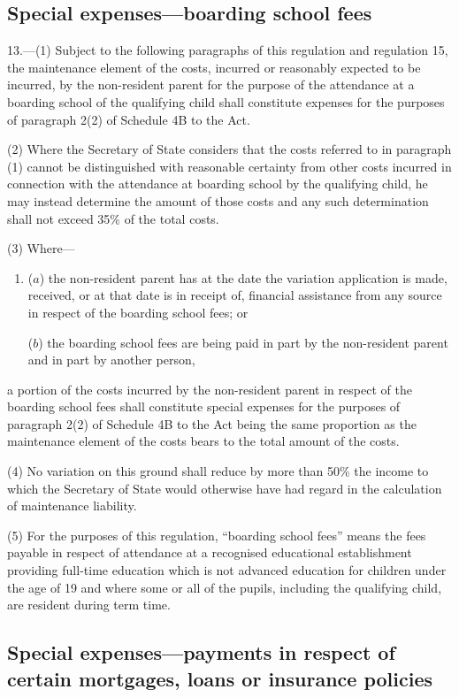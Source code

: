 \documentclass[12pt,a4paper]{article}
\begin{document}
\subsection[13. Special expenses—boarding school fees]{Special expenses—boarding school fees}

13.---(1)  Subject to the following paragraphs of this regulation and regulation 15, the maintenance element of the costs, incurred or reasonably expected to be incurred, by the non-resident parent for the purpose of the attendance at a boarding school of the qualifying child shall constitute expenses for the purposes of paragraph 2(2) of Schedule 4B to the Act.

(2) Where the Secretary of State considers that the costs referred to in paragraph (1) cannot be distinguished with reasonable certainty from other costs incurred in connection with the attendance at boarding school by the qualifying child, he may instead determine the amount of those costs and any such determination shall not exceed 35\% of the total costs.

(3) Where—
\begin{enumerate}\item[]
($a$) the non-resident parent has at the date the variation application is made, received, or at that date is in receipt of, financial assistance from any source in respect of the boarding school fees; or

($b$) the boarding school fees are being paid in part by the non-resident parent and in part by another person,
\end{enumerate}
a portion of the costs incurred by the non-resident parent in respect of the boarding school fees shall constitute special expenses for the purposes of paragraph 2(2) of Schedule 4B to the Act being the same proportion as the maintenance element of the costs bears to the total amount of the costs.

(4) No variation on this ground shall reduce by more than 50\% the income to which the Secretary of State would otherwise have had regard in the calculation of maintenance liability.

(5) For the purposes of this regulation, “boarding school fees” means the fees payable in respect of attendance at a recognised educational establishment providing full-time education which is not advanced education for children under the age of 19 and where some or all of the pupils, including the qualifying child, are resident during term time.

\subsection[14. Special expenses—payments in respect of certain mortgages, loans or insurance policies]{\sloppy Special expenses—payments in respect of certain mortgages, loans or insurance policies}
\end{document}
